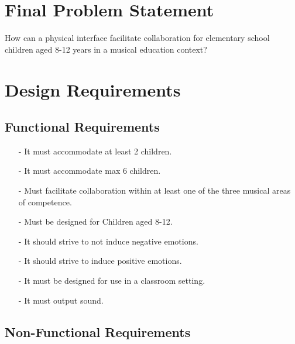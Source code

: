 \section{Final Problem Statement}
	How can a physical interface facilitate collaboration for elementary school children aged 8-12 years in a musical education context?
	
\section{Design Requirements}
	\subsection*{Functional Requirements}
		\begin{itemize}
			\item[-] It must accommodate at least 2 children.\\
			\item[-] It must accommodate max 6 children.\\
			\item[-] Must facilitate collaboration within at least one of the three musical areas of competence.\\
			\item[-] Must be designed for Children aged 8-12.\\
			\item[-] It should strive to not induce  negative emotions.\\
			\item[-] It should strive to induce positive emotions.\\
			\item[-] It must be designed for use in a classroom setting.\\
			\item[-] It must output sound.
		\end{itemize}
	\subsection*{Non-Functional Requirements}
		
	
















		